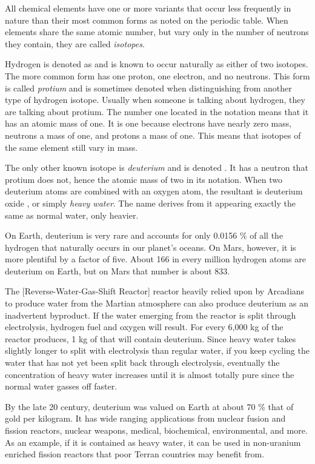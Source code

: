 All chemical elements have one or more variants that occur less frequently in nature than their most common forms as noted on the periodic table. When elements share the same atomic number, but vary only in the number of neutrons they contain, they are called {\it isotopes}.

Hydrogen is denoted as  and is known to occur naturally as either of two isotopes. The more common form has one proton, one electron, and no neutrons. This form is called {\it protium} and is sometimes denoted  when distinguishing from another type of hydrogen isotope. Usually when someone is talking about hydrogen, they are talking about protium. The number one located in the notation means that it has an atomic mass of one. It is one because electrons have nearly zero mass, neutrons a mass of one, and protons a mass of one. This means that isotopes of the same element still vary in mass.

The only other known isotope is {\it deuterium} and is denoted . It has a neutron that protium does not, hence the atomic mass of two in its notation. When two deuterium atoms are combined with an oxygen atom, the resultant is deuterium oxide , or simply {\it heavy water}. The name derives from it appearing exactly the same as normal water, only heavier.

On Earth, deuterium is very rare and accounts for only 0.0156 \% of all the hydrogen that naturally occurs in our planet's oceans. On Mars, however, it is more plentiful by a factor of five. About 166 in every million hydrogen atoms are deuterium on Earth, but on Mars that number is about 833. 

The [Reverse-Water-Gas-Shift Reactor] reactor heavily relied upon by Arcadians to produce water from the Martian atmosphere can also produce deuterium as an inadvertent byproduct. If the water emerging from the reactor is split through electrolysis, hydrogen fuel and oxygen will result. For every 6,000 kg of  the reactor produces, 1 kg of that will contain deuterium. Since heavy water takes slightly longer to split with electrolysis than regular water, if you keep cycling the water that has not yet been split back through electrolysis, eventually the concentration of heavy water increases until it is almost totally pure since the normal water gasses off faster.

By the late 20 century, deuterium was valued on Earth at about 70 \% that of gold per kilogram. It has wide ranging applications from nuclear fusion and fission reactors, nuclear weapons, medical, biochemical, environmental, and more. As an example, if it is contained as heavy water, it can be used in non-uranium enriched fission reactors that poor Terran countries may benefit from.


